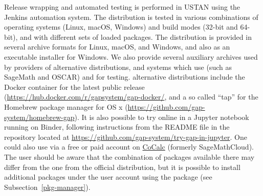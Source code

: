 Release wrapping and automated testing is performed in USTAN
using the Jenkins automation system. The \GAP distribution is tested
in various combinations of operating systems (Linux, macOS, Windows)
and build modes (32-bit and 64-bit), and with different sets of
loaded packages.
The \GAP distribution is provided in several archive formats for
Linux, macOS, and Windows,
and also as an executable installer for Windows.
We also provide several auxiliary archives used by providers of alternative
distributions, and systems which use \GAP (such as SageMath and OSCAR)
and for testing.
\GAP alternative distributions include the Docker container for the 
latest public \GAP release (\url{https://hub.docker.com/r/gapsystem/gap-docker/},
and a so called ``tap'' for the Homebrew package manager for OS x
(\url{https://github.com/gap-system/homebrew-gap}). 
It is also possible to try \GAP online in a Jupyter notebook running 
on Binder, following instructions from the README file in the repository
located at \url{https://github.com/gap-system/try-gap-in-jupyter}.
One could also use \GAP via a free or paid account
on \href{https://cocalc.com/}{\sf CoCalc} (formerly SageMathCloud).
The user should be aware that the combination of \GAP packages 
available there may differ from the one from the official \GAP distribution,
but it is possible to install additional packages under the user account
using the  package (see Subsection~\ref{pkg-manager}).
